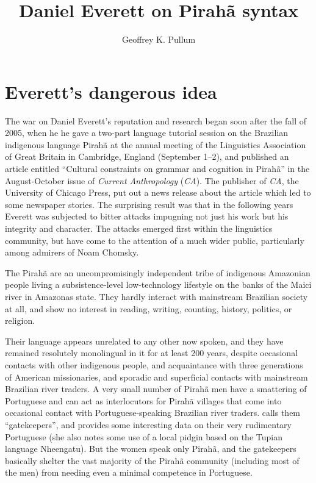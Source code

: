 \documentclass[output=paper,colorlinks,citecolor=brown
]{langscibook}
\author{Geoffrey K. Pullum\orcid{0000-0002-7748-8847}\affiliation{University of Edinburgh}}
\title{Daniel Everett on Pirahã syntax}
\begin{document}
\maketitle
\label{chap-3_pullum}


\section{Everett's dangerous idea}\label{intro}

The war on Daniel Everett's reputation and research began soon after
the fall of 2005, when he he gave a two-part language tutorial session
on the Brazilian indigenous language Pirah{\~a} at the annual meeting
of the Linguistics Association of Great Britain in Cambridge, England
(September 1--2), and published an article entitled ``Cultural constraints
on grammar and cognition in Pirah{\~a}'' in the August-October issue of
\textit{Current Anthropology} (\textit{CA}). The publisher of \textit{CA},
the University of Chicago Press, put out a news release about the article
which led to some newspaper stories. The surprising result was that in
the following years Everett was subjected to bitter attacks impugning
not just his work but his integrity and character. The attacks emerged
first within the linguistics community, but have come to the attention
of a much wider public, particularly among admirers of Noam Chomsky.

The Pirah{\~a} are an uncompromisingly independent tribe of indigenous
Amazonian people living a subsistence-level low-technology lifestyle
on the banks of the Maici river in Amazonas state. They hardly interact
with mainstream Brazilian society at all, and show no interest in
reading, writing, counting, history, politics, or religion.

Their language appears unrelated to any other now spoken, and they
have remained resolutely monolingual in it for at least 200 years,
despite occasional contacts with other indigenous people, and
acquaintance with three generations of American missionaries, and
sporadic and superficial contacts with mainstream Brazilian river
traders. A very small number of Pirah{\~a} men have a smattering of
Portuguese and can act as interlocutors for Pirah{\~a} villages that
come into occasional contact with Portuguese-speaking Brazilian river
traders. \citet{Sakel12} calls them ``gatekeepers'', and provides
some interesting data on their very rudimentary Portuguese (she
also notes some use of a local pidgin based on the Tupian language
Nheengatu). But the women speak only Pirah{\~a}, and the gatekeepers
basically shelter the vast majority of the Pirah{\~a} community
(including most of the men) from needing even a minimal competence
in Portuguese.
\end{document}
